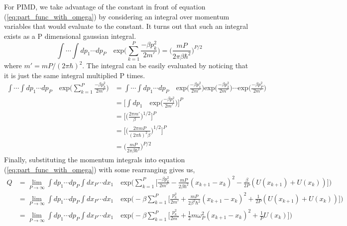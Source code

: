 \documentclass{article}
\newcommand{\be}{\begin{equation}}
\newcommand{\ee}{\end{equation}}
\begin{document}
For PIMD, we take advantage of the constant in front of equation (\ref{eq:part_func_with_omega}) by considering an integral over momentum variables that would evaluate to the constant.
It turns out that such an integral exists as a P dimensional gaussian integral.
\be
  \int \cdots \int dp_1 \cdots dp_P \quad \text{exp}\Big( \sum_{k=1}^P \frac{-\beta p^2_k}{2m'} \Big) = \Big( \frac{mP}{2 \pi \beta \hbar^2} \Big)^{P/2}
\ee
where $m' = mP/(2 \pi \hbar)^2$.
The integral can be easily evaluated by noticing that it is just the same integral multiplied P times.
\be
  \begin{split}
    \int \cdots \int dp_1 \cdots dp_P \quad \text{exp}\Big( \sum_{k=1}^P \frac{-\beta p^2_k}{2m'} \Big) &= \int \cdots \int dp_1 \cdots dp_P \quad \text{exp}\Big(\frac{-\beta p^2_1}{2m'} \Big) \text{exp}\Big( \frac{-\beta p^2_2}{2m'}\Big) \cdots \text{exp}\Big( \frac{-\beta p^2_P}{2m'} \Big) \\
    &= \Big[ \int dp_1 \quad \text{exp} \Big( \frac{-\beta p^2_1}{2m'} \Big)\Big]^P \\
    &= \Big[ \Big( \frac{2 \pi m'}{\beta} \Big)^{1/2} \Big]^P \\
    &= \Big[ \Big( \frac{2 \pi m P}{(2 \pi \hbar)^2 \beta } \Big)^{1/2} \Big]^P \\
    &= \Big( \frac{mP}{2 \pi \beta \hbar^2} \Big)^{P/2}
  \end{split}
\ee
Finally, substituting the momentum integrals into equation (\ref{eq:part_func_with_omega}) with some rearranging gives us,
\be
  \begin{split}
    Q &= \lim_{P \to\infty} \int dp_1 \cdots dp_P \int dx_P \cdots dx_1 \quad \text{exp}\Big( \sum_{k=1}^P \Big[ \frac{-\beta p^2_k}{2m'} - \frac{mP}{2 \beta \hbar^2}(x_{k+1} - x_k)^2 - \frac{\beta}{2P}(U(x_{k+1}) + U(x_k)) \Big] \Big) \\
    &= \lim_{P \to\infty} \int dp_1 \cdots dp_P \int dx_P \cdots dx_1 \quad \text{exp}\Big( - \beta \sum_{k=1}^P \Big[ \frac{p^2_k}{2m'} + \frac{mP}{2 \beta^2 \hbar^2}(x_{k+1} - x_k)^2 + \frac{1}{2P}(U(x_{k+1}) + U(x_k)) \Big] \Big) \\
    &= \lim_{P \to\infty} \int dp_1 \cdots dp_P \int dx_P \cdots dx_1 \quad \text{exp}\Big( - \beta \sum_{k=1}^P \Big[ \frac{p^2_k}{2m'} + \frac{1}{2} m \omega^2_P (x_{k+1} - x_k)^2 + \frac{1}{P} U(x_k) \Big] \Big) \\
  \end{split}
\ee



\end{document}
